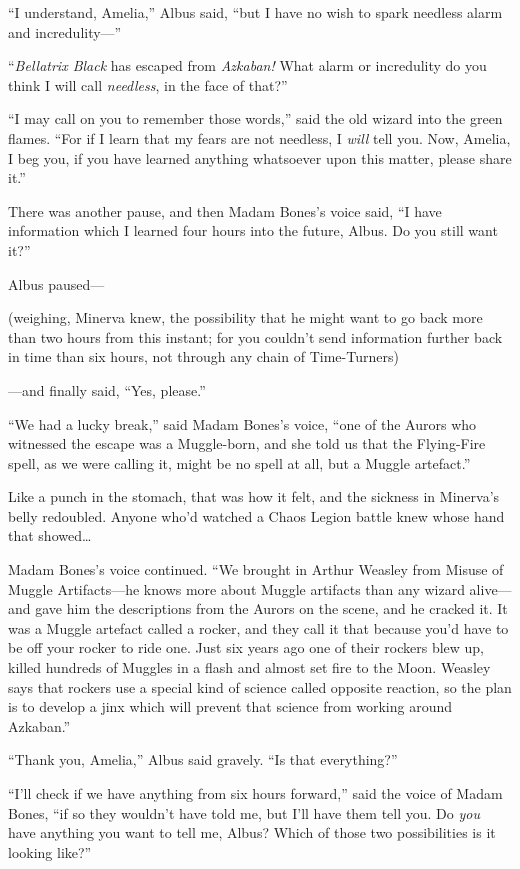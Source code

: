 “I understand, Amelia,” Albus said, “but I have no wish to spark needless alarm and incredulity—”

“\emph{Bellatrix Black} has escaped from \emph{Azkaban!} What alarm or incredulity do you think I will call \emph{needless}, in the face of that?”

“I may call on you to remember those words,” said the old wizard into the green flames.
“For if I learn that my fears are not needless, I \emph{will} tell you. Now, Amelia, I beg you, if you have learned anything whatsoever upon this matter, please share it.”

There was another pause, and then Madam Bones’s voice said,
“I have information which I learned four hours into the future, Albus. Do you still want it?”

Albus paused—

(weighing, Minerva knew, the possibility that he might want to go back more than two hours from this instant; for you couldn’t send information further back in time than six hours, not through any chain of Time-Turners)

—and finally said,
“Yes, please.”

“We had a lucky break,” said Madam Bones’s voice, “one of the Aurors who witnessed the escape was a Muggle-born, and she told us that the Flying-Fire spell, as we were calling it, might be no spell at all, but a Muggle artefact.”

Like a punch in the stomach, that was how it felt, and the sickness in Minerva’s belly redoubled. Anyone who’d watched a Chaos Legion battle knew whose hand that showed…

Madam Bones’s voice continued.
“We brought in Arthur Weasley from Misuse of Muggle Artifacts—he knows more about Muggle artifacts than any wizard alive—and gave him the descriptions from the Aurors on the scene, and he cracked it. It was a Muggle artefact called a rocker, and they call it that because you’d have to be off your rocker to ride one. Just six years ago one of their rockers blew up, killed hundreds of Muggles in a flash and almost set fire to the Moon. Weasley says that rockers use a special kind of science called opposite reaction, so the plan is to develop a jinx which will prevent that science from working around Azkaban.”

“Thank you, Amelia,” Albus said gravely.
“Is that everything?”

“I’ll check if we have anything from six hours forward,” said the voice of Madam Bones, “if so they wouldn’t have told me, but I’ll have them tell you. Do \emph{you} have anything you want to tell me, Albus? Which of those two possibilities is it looking like?”

